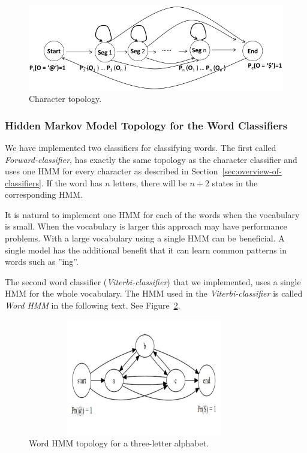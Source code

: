 \begin{figure}[h!]
\centering
\includegraphics[scale=1.1]{character-topology}
\caption{Character topology.}
\label{figure:charactertopology}
\end{figure}


\subsubsection{Hidden Markov Model Topology for the Word Classifiers}\label{sec:word_classifiers}

We have implemented two classifiers for classifying words. 
The first called \emph{Forward-classifier}, has exactly the same topology as the character classifier and uses one HMM for every character as described in Section~\ref{sec:overview-of-classifiers}. 
If the word has $n$ letters, there will be $n + 2$ states in the corresponding HMM.

It is natural to implement one HMM for each of the words when the vocabulary is small.
When the vocabulary is larger this approach may have performance problems.
With a large vocabulary using a single HMM can be beneficial.
A single model has the additional benefit that it can learn common patterns in words such as ''ing''.

The second word classifier (\emph{Viterbi-classifier}) that we implemented, uses a single HMM for the whole vocabulary. 
The HMM used in the \emph{Viterbi-classifier} is called \textit{Word HMM} in the following text.
See Figure~\ref{figure:wordtopology}.

\begin{figure}[h!]
\centering
\includegraphics[width=4in,height=2in]{wordtopology}
\caption{Word HMM topology for a three-letter alphabet.}
\label{figure:wordtopology}
\end{figure}


